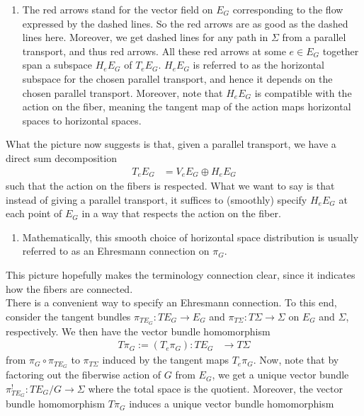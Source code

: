 \begin{enumerate}
\begin{enumerate}
\item[$\bullet$]
The red arrows stand for the vector field on $E_{G}$ corresponding to the flow expressed by the dashed lines.
So the red arrows are as good as the dashed lines here.
Moreover, we get dashed lines for any path in $\Sigma$ from a parallel transport, and thus red arrows.
All these red arrows at some $e \in E_{G}$ together span a subspace $H_{e}E_{G}$ of $T_{e}E_{G}$.
$H_{e}E_{G}$ is referred to as the horizontal subspace for the chosen parallel transport, and hence it depends on the chosen parallel transport.
Moreover, note that $H_{e}E_{G}$ is compatible with the action on the fiber, meaning the tangent map of the action maps horizontal spaces to horizontal spaces.
\end{enumerate}
What the picture now suggests is that, given a parallel transport, we have a direct sum decomposition
\begin{align*}
  T_{e}E_{G}
  &=
  V_{e}E_{G}
  \oplus
  H_{e}E_{G}
\end{align*}
such that the action on the fibers is respected.
What we want to say is that instead of giving a parallel transport, it suffices to (smoothly) specify $H_{e}E_{G}$ at each point of $E_{G}$ in a way that respects the action on the fiber.
\begin{enumerate}
\item[$\pmb{\hookrightarrow}$]
Mathematically, this smooth choice of horizontal space distribution is usually referred to as an Ehresmann connection on $\pi_{G}$.
\end{enumerate}
This picture hopefully makes the terminology {\glqq}connection{\grqq} clear, since it indicates how the fibers are {\glqq}connected{\grqq}.
\\
There is a convenient way to specify an Ehresmann connection.
To this end, consider the tangent bundles $\pi_{TE_{G}} \colon TE_{G} \rightarrow E_{G}$ and $\pi_{T\Sigma} \colon T\Sigma \rightarrow \Sigma$ on $E_{G}$ and $\Sigma$, respectively.
We then have the vector bundle homomorphism
\begin{align*}
  T\pi_{G}
  :=
  (T_{e}\pi_{G})
  \colon
  TE_{G}
  &\rightarrow
  T\Sigma
\end{align*}
from $\pi_{G} \circ \pi_{TE_{G}}$ to $\pi_{T\Sigma}$ induced by the tangent maps $T_{e}\pi_{G}$.
Now, note that by factoring out the fiberwise action of $G$ from $E_{G}$, we get a unique vector bundle $\pi_{TE_{G}}^{!} \colon TE_{G} \slash G \rightarrow \Sigma$ where the total space is the quotient.
Moreover, the vector bundle homomorphism $T\pi_{G}$ induces a unique vector bundle homomorphism

\end{enumerate}

